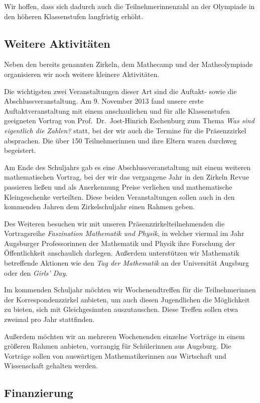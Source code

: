 \documentclass[12pt]{zettel}
\begin{document}
Wir hoffen, dass sich dadurch auch die Teilnehmerinnenzahl an der Olympiade
in den höheren Klassenstufen langfristig erhöht.


\subsection{Weitere Aktivitäten}

Neben den bereits genannten Zirkeln, dem Mathecamp und der
Matheolympiade organisieren wir noch weitere kleinere
Aktivitäten.

Die wichtigsten zwei Veranstaltungen dieser Art sind die Auftakt- sowie die
Abschlussveranstaltung. Am 9. November 2013 fand unsere erste
Auftaktveranstaltung mit einem anschaulichen und für alle Klassenstufen
geeigneten Vortrag von
Prof.~Dr.~Jost-Hinrich Eschenburg zum Thema \emph{Was sind eigentlich die
Zahlen?} statt, bei der wir auch die Termine für die Präsenzzirkel absprachen.
Die über 150 Teilnehmerinnen und ihre Eltern waren durchweg
begeistert.

Am Ende des Schuljahrs gab es eine Abschlussveranstaltung mit einem
weiteren mathematischen Vortrag, bei der wir
das vergangene Jahr in den Zirkeln Revue passieren ließen und als Anerkennung
Preise verliehen und mathematische Kleingeschenke verteilten. Diese beiden Veranstaltungen sollen
auch in den kommenden Jahren dem Zirkelschuljahr einen Rahmen geben.

Des Weiteren besuchen wir mit unseren Präsenzzirkelteilnehmenden die
Vortragsreihe \emph{Faszination Mathematik und Physik}, in welcher viermal im
Jahr Augsburger Professorinnen der Mathematik und Physik ihre Forschung der
Öffent\-lich\-keit anschaulich darlegen. Außerdem unterstützen wir
Mathematik betreffende Aktionen wie den \emph{Tag der Mathematik} an
der Universität Augsburg oder den \emph{Girls' Day}.

Im kommenden Schuljahr möchten wir Wochenendtreffen für die Teil\-neh\-mer\-in\-nen der Korrespondenzzirkel anbieten, um auch diesen Jugendlichen die
Möglichkeit zu bieten, sich mit Gleichgesinnten auszutauschen. Diese Treffen
sollen etwa zweimal pro Jahr stattfinden.

Außerdem möchten wir an mehreren Wochenenden einzelne Vorträge in einem
größeren Rahmen anbieten, vorrangig für Schülerinnen aus Augsburg.
Die Vorträge sollen von auswärtigen Mathematikerinnen aus Wirtschaft und Wissenschaft gehalten werden.


\newpage

\subsection{Finanzierung}
\end{document}

